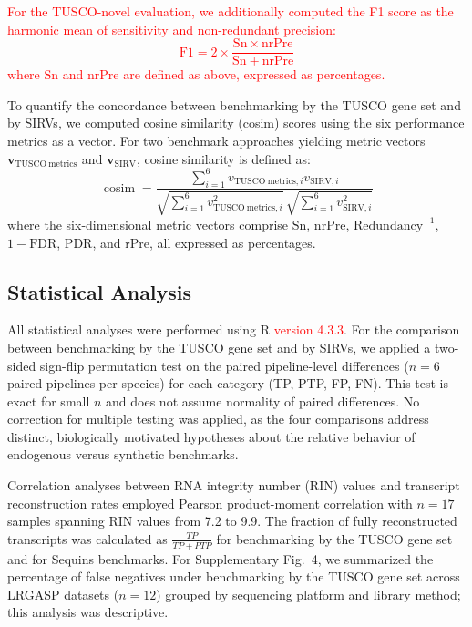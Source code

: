 \documentclass[pdflatex,sn-nature]{sn-jnl}%
\newcommand{\tuscoGeneSet}{TUSCO gene set}
\newcommand{\tuscoNovel}{TUSCO-novel}
\begin{document}
\textcolor{red}{For the \tuscoNovel{} evaluation, we additionally computed the F1 score as the harmonic mean of sensitivity and non-redundant precision:
\begin{equation}
\mathrm{F1} = 2 \times \frac{\mathrm{Sn} \times \mathrm{nrPre}}{\mathrm{Sn} + \mathrm{nrPre}}
\end{equation}
where $\mathrm{Sn}$ and $\mathrm{nrPre}$ are defined as above, expressed as percentages.}

To quantify the concordance between benchmarking by the \tuscoGeneSet{} and by SIRVs, we computed cosine similarity (cosim) scores using the six performance metrics as a vector. For two benchmark approaches yielding metric vectors $\boldsymbol{v}_{\mathrm{TUSCO\ metrics}}$ and $\boldsymbol{v}_{\mathrm{SIRV}}$, cosine similarity is defined as:
\begin{equation}
\operatorname{cosim} = \frac{\sum_{i=1}^{6} v_{\mathrm{TUSCO\ metrics}, i} v_{\mathrm{SIRV}, i}}{\sqrt{\sum_{i=1}^{6} v_{\mathrm{TUSCO\ metrics}, i}^2}\, \sqrt{\sum_{i=1}^{6} v_{\mathrm{SIRV}, i}^2}}
\end{equation}
where the six-dimensional metric vectors comprise $\mathrm{Sn}$, $\mathrm{nrPre}$, $\mathrm{Redundancy}^{-1}$, $1 - \mathrm{FDR}$, $\mathrm{PDR}$, and $\mathrm{rPre}$, all expressed as percentages.

\subsection{Statistical Analysis}

All statistical analyses were performed using R \textcolor{red}{version 4.3.3}. For the comparison between benchmarking by the \tuscoGeneSet{} and by SIRVs, we applied a two-sided sign-flip permutation test on the paired pipeline-level differences ($n=6$ paired pipelines per species) for each category (TP, PTP, FP, FN). This test is exact for small $n$ and does not assume normality of paired differences. No correction for multiple testing was applied, as the four comparisons address distinct, biologically motivated hypotheses about the relative behavior of endogenous versus synthetic benchmarks.

Correlation analyses between RNA integrity number (RIN) values and transcript reconstruction rates employed Pearson product-moment correlation with $n = 17$ samples spanning RIN values from 7.2 to 9.9. The fraction of fully reconstructed transcripts was calculated as $\frac{TP}{TP + PTP}$ for benchmarking by the \tuscoGeneSet{} and for Sequins benchmarks. For Supplementary Fig.~4, we summarized the percentage of false negatives under benchmarking by the \tuscoGeneSet{} across LRGASP datasets ($n = 12$) grouped by sequencing platform and library method; this analysis was descriptive.
\end{document}
